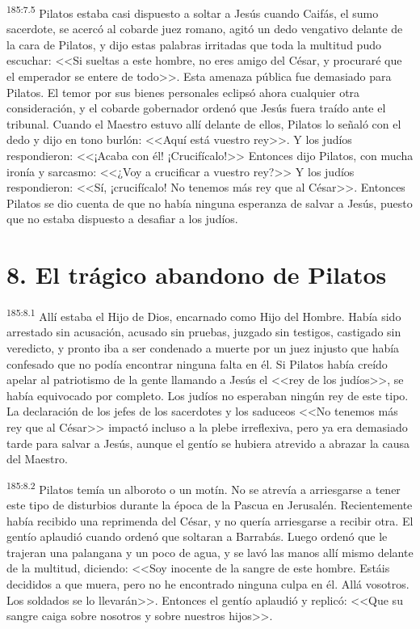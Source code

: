 \par 
\textsuperscript{185:7.5} Pilatos estaba casi dispuesto a soltar a Jesús cuando Caifás, el sumo sacerdote, se acercó al cobarde juez romano, agitó un dedo vengativo delante de la cara de Pilatos, y dijo estas palabras irritadas que toda la multitud pudo escuchar: <<Si sueltas a este hombre, no eres amigo del César, y procuraré que el emperador se entere de todo>>. Esta amenaza pública fue demasiado para Pilatos. El temor por sus bienes personales eclipsó ahora cualquier otra consideración, y el cobarde gobernador ordenó que Jesús fuera traído ante el tribunal. Cuando el Maestro estuvo allí delante de ellos, Pilatos lo señaló con el dedo y dijo en tono burlón: <<Aquí está vuestro rey>>. Y los judíos respondieron: <<¡Acaba con él! ¡Crucifícalo!>> Entonces dijo Pilatos, con mucha ironía y sarcasmo: <<¿Voy a crucificar a vuestro rey?>> Y los judíos respondieron: <<Sí, ¡crucifícalo! No tenemos más rey que al César>>. Entonces Pilatos se dio cuenta de que no había ninguna esperanza de salvar a Jesús, puesto que no estaba dispuesto a desafiar a los judíos.

\section*{8. El trágico abandono de Pilatos}
\par 
\textsuperscript{185:8.1} Allí estaba el Hijo de Dios, encarnado como Hijo del Hombre. Había sido arrestado sin acusación, acusado sin pruebas, juzgado sin testigos, castigado sin veredicto, y pronto iba a ser condenado a muerte por un juez injusto que había confesado que no podía encontrar ninguna falta en él. Si Pilatos había creído apelar al patriotismo de la gente llamando a Jesús el <<rey de los judíos>>, se había equivocado por completo. Los judíos no esperaban ningún rey de este tipo. La declaración de los jefes de los sacerdotes y los saduceos <<No tenemos más rey que al César>> impactó incluso a la plebe irreflexiva, pero ya era demasiado tarde para salvar a Jesús, aunque el gentío se hubiera atrevido a abrazar la causa del Maestro.

\par 
\textsuperscript{185:8.2} Pilatos temía un alboroto o un motín. No se atrevía a arriesgarse a tener este tipo de disturbios durante la época de la Pascua en Jerusalén. Recientemente había recibido una reprimenda del César, y no quería arriesgarse a recibir otra. El gentío aplaudió cuando ordenó que soltaran a Barrabás. Luego ordenó que le trajeran una palangana y un poco de agua, y se lavó las manos allí mismo delante de la multitud, diciendo: <<Soy inocente de la sangre de este hombre. Estáis decididos a que muera, pero no he encontrado ninguna culpa en él. Allá vosotros. Los soldados se lo llevarán>>. Entonces el gentío aplaudió y replicó: <<Que su sangre caiga sobre nosotros y sobre nuestros hijos>>.